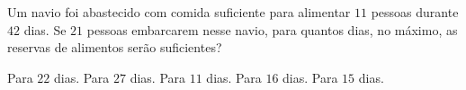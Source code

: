 Um navio foi abastecido com comida suficiente para alimentar $11$ pessoas durante $42$ dias. Se $21$ pessoas embarcarem nesse navio, para quantos dias, no máximo, as reservas de alimentos serão suficientes?

Para $22$ dias.
Para $27$ dias.
Para $11$ dias.
Para $16$ dias.
Para $15$ dias.



